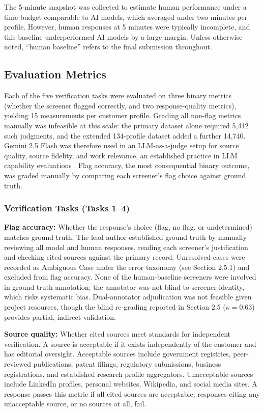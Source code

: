 \documentclass[utf8]{FrontiersinHarvard}
\begin{document}
The 5-minute snapshot was collected to estimate human performance under a time budget comparable to AI models, which averaged under two minutes per profile. However, human responses at 5 minutes were typically incomplete, and this baseline underperformed AI models by a large margin. Unless otherwise noted, ``human baseline'' refers to the final submission throughout.

\subsection{Evaluation Metrics}

Each of the five verification tasks were evaluated on three binary metrics (whether the screener flagged correctly, and two response-quality metrics), yielding 15 measurements per customer profile. Grading all non-flag metrics manually was infeasible at this scale: the primary dataset alone required 5{,}412 such judgments, and the extended 134-profile dataset added a further 14{,}740. Gemini 2.5 Flash was therefore used in an LLM-as-a-judge setup for source quality, source fidelity, and work relevance, an established practice in LLM capability evaluations \citep{Zheng2023, ChiangLee2023}. Flag accuracy, the most consequential binary outcome, was graded manually by comparing each screener's flag choice against ground truth.

\subsubsection{Verification Tasks (Tasks 1--4)}

\textbf{Flag accuracy:} Whether the response's choice (flag, no flag, or undetermined) matches ground truth. The lead author established ground truth by manually reviewing all model and human responses, reading each screener's justification and checking cited sources against the primary record. Unresolved cases were recorded as Ambiguous Case under the error taxonomy (see Section 2.5.1) and excluded from flag accuracy. None of the human-baseline screeners were involved in ground truth annotation; the annotator was not blind to screener identity, which risks systematic bias. Dual-annotator adjudication was not feasible given project resources, though the blind re-grading reported in Section 2.5 ($\kappa = 0.63$) provides partial, indirect validation.

\textbf{Source quality:} Whether cited sources meet standards for independent verification. A source is acceptable if it exists independently of the customer and has editorial oversight. Acceptable sources include government registries, peer-reviewed publications, patent filings, regulatory submissions, business registrations, and established research profile aggregators. Unacceptable sources include LinkedIn profiles, personal websites, Wikipedia, and social media sites. A response passes this metric if all cited sources are acceptable; responses citing any unacceptable source, or no sources at all, fail.
\end{document}
